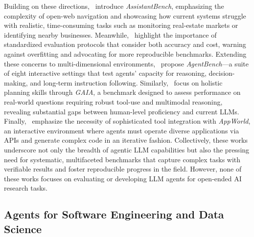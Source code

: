 \documentclass[]{fairmeta}
\begin{document}
Building on these directions,~\citet{yoranAssistantBenchCanWeb2024} introduce \textit{AssistantBench}, emphasizing the complexity of open-web navigation and showcasing how current systems struggle with realistic, time-consuming tasks such as monitoring real-estate markets or identifying nearby businesses. Meanwhile,~\citet{kapoor2024aiagentsmatter} highlight the importance of standardized evaluation protocols that consider both accuracy and cost, warning against overfitting and advocating for more reproducible benchmarks. Extending these concerns to multi-dimensional environments,~\citet{liuAgentBenchEvaluatingLLMs2023} propose \textit{AgentBench}—a suite of eight interactive settings that test agents’ capacity for reasoning, decision-making, and long-term instruction following. Similarly,~\citet{mialonGAIABenchmarkGeneral2023} focus on holistic planning skills through \textit{GAIA}, a benchmark designed to assess performance on real-world questions requiring robust tool-use and multimodal reasoning, revealing substantial gaps between human-level proficiency and current LLMs. Finally,~\citet{trivediAppWorldControllableWorld2024} emphasize the necessity of sophisticated tool integration with \textit{AppWorld}, an interactive environment where agents must operate diverse applications via APIs and generate complex code in an iterative fashion. Collectively, these works underscore not only the breadth of agentic LLM capabilities but also the pressing need for systematic, multifaceted benchmarks that capture complex tasks with verifiable results and foster reproducible progress in the field. However, none of these works focuses on evaluating or developing LLM agents for open-ended AI research tasks.








\subsection{Agents for Software Engineering and Data Science}
\end{document}

